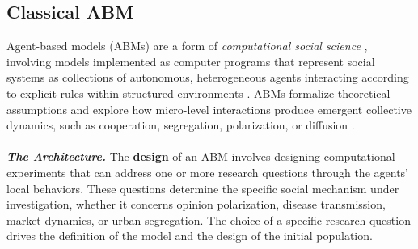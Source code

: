 \documentclass[11pt]{article}
\begin{document}
\subsection{Classical ABM}
\label{subsec:abm}
Agent-based models (ABMs) 
are a form of \textit{computational social science} \cite{conte2012manifesto}, involving models implemented as computer programs \cite{gilbert2019agent} that represent social systems as collections of autonomous, heterogeneous agents interacting according to explicit rules within structured environments \cite{bianchi2015agent}. 
ABMs formalize theoretical assumptions and explore how micro-level interactions produce emergent collective dynamics, such as cooperation, segregation, polarization, or diffusion \cite{bianchi2015agent}. 
\\ \ \\
\textbf{\textit{The Architecture.}}
The \textbf{design} of an ABM involves designing computational experiments that can address one or more research questions through the agents' local behaviors. 
These questions determine the specific social mechanism 
under investigation, whether it concerns opinion polarization, disease transmission, market dynamics, or urban segregation.
The choice of a specific research question drives the definition of the model and the design of the initial population. 
\end{document}
